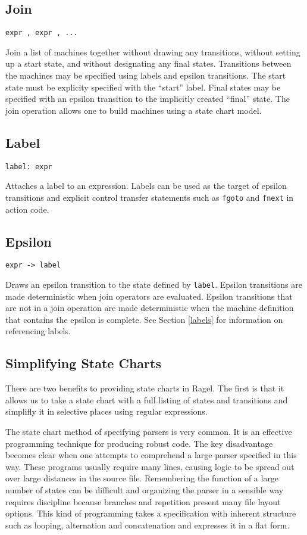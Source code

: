 \documentclass[letterpaper,11pt,oneside]{book}
\newcommand{\verbspace}{\vspace{10pt}}
\begin{document}
\subsection{Join}

\verb|expr , expr , ...|
\verbspace

Join a list of machines together without
drawing any transitions, without setting up a start state, and without
designating any final states. Transitions between the machines may be specified
using labels and epsilon transitions. The start state must be explicity
specified with the ``start'' label. Final states may be specified with an
epsilon transition to the implicitly created ``final'' state. The join
operation allows one to build machines using a state chart model.

\subsection{Label}

\verb|label: expr| 
\verbspace

Attaches a label to an expression. Labels can be
used as the target of epsilon transitions and explicit control transfer
statements such as \verb|fgoto| and \verb|fnext| in action
code.

\subsection{Epsilon}

\verb|expr -> label| 
\verbspace

Draws an epsilon transition to the state defined
by \verb|label|.  Epsilon transitions are made deterministic when join
operators are evaluated. Epsilon transitions that are not in a join operation
are made deterministic when the machine definition that contains the epsilon is
complete. See Section \ref{labels} for information on referencing labels.

\subsection{Simplifying State Charts}

There are two benefits to providing state charts in Ragel. The first is that it
allows us to take a state chart with a full listing of states and transitions
and simplifly it in selective places using regular expressions.

The state chart method of specifying parsers is very common.  It is an
effective programming technique for producing robust code. The key disadvantage
becomes clear when one attempts to comprehend a large parser specified in this
way.  These programs usually require many lines, causing logic to be spread out
over large distances in the source file. Remembering the function of a large
number of states can be difficult and organizing the parser in a sensible way
requires discipline because branches and repetition present many file layout
options.  This kind of programming takes a specification with inherent
structure such as looping, alternation and concatenation and expresses it in a
flat form. 
\end{document}
